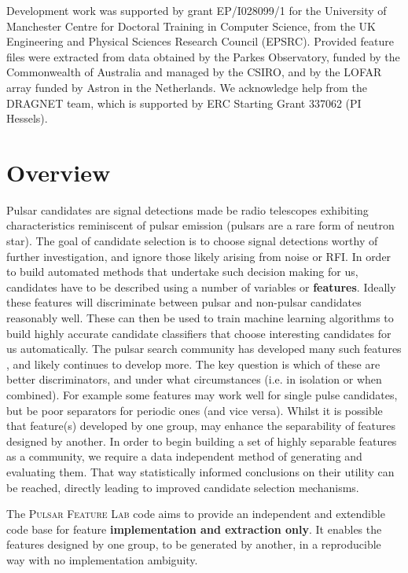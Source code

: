 \documentclass[twoside,a4paper]{refart}
\begin{document}
Development work was supported by grant EP/I028099/1 for the University of Manchester Centre for Doctoral Training in Computer Science, from the UK Engineering and Physical Sciences Research Council (EPSRC). Provided feature files were extracted from data obtained by the Parkes Observatory, funded by the Commonwealth of Australia and managed by the CSIRO, and by the LOFAR array funded by Astron in the Netherlands. We acknowledge help from the DRAGNET team, which is supported by ERC Starting Grant 337062 (PI Hessels).

\section{Overview}
Pulsar candidates are signal detections made be radio telescopes exhibiting characteristics reminiscent of pulsar emission (pulsars are a rare form of neutron star). The goal of candidate selection is to choose signal detections worthy of further investigation, and ignore those likely arising from noise or RFI. In order to build automated methods that undertake such decision making for us, candidates have to be described using a number of variables or \textbf{features}. Ideally these features will discriminate between pulsar and non-pulsar candidates reasonably well. These can then be used to train machine learning algorithms \cite{Bishop:2006:pr} to build highly accurate candidate classifiers that choose interesting candidates for us automatically. The pulsar search community has developed many such features \cite{Eatough:2010:uz,Bates:2012:mb,ThorntonPhD:1,Lee:2013:sk,Morello:2014:eb,Lyon:2015:jk}, and likely continues to develop more. The key question is which of these are better discriminators, and under what circumstances (i.e. in isolation or when combined). For example some features may work well for single pulse candidates, but be poor separators for periodic ones (and vice versa). Whilst it is possible that feature(s) developed by one group, may enhance the separability of features designed by another. In order to begin building a set of highly separable features as a community, we require a data independent method of generating and evaluating them. That way statistically informed conclusions on their utility can be reached, directly leading to improved candidate selection mechanisms. 

The \textsc{Pulsar Feature Lab} code aims to provide an independent and extendible code base for feature \textbf{implementation and extraction only}. It enables the features designed by one group, to be generated by another, in a reproducible way with no implementation ambiguity. 
\newpage
\end{document}

